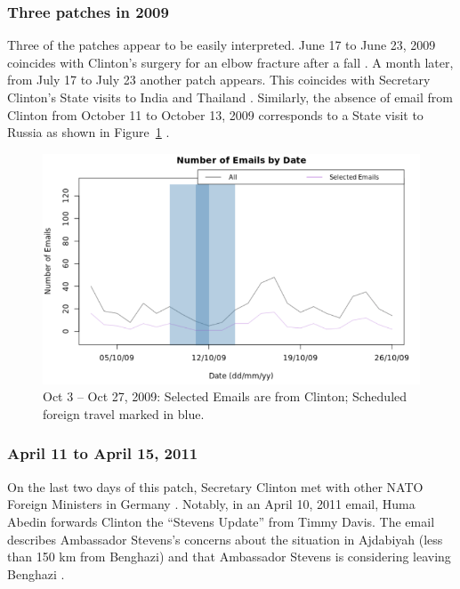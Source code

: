 \documentclass[journal]{vgtc}                %
\begin{document}
\subsubsection{Three patches in 2009}
Three of the patches appear to be easily interpreted.   June 17 to June 23, 2009 coincides with Clinton's surgery for an elbow fracture after a fall \cite{ClintonFracture2009}.  A month later, from July 17 to July 23 another patch appears.  This coincides with Secretary Clinton's State visits to India and Thailand \cite{ForeignSched}.  Similarly, the absence of email from Clinton from October 11 to  October 13, 2009 corresponds to a State visit to Russia as shown in  Figure~\ref{fig:ClintonZerosOctober2009AndForeignSchedule} \cite{ForeignSched, visitRussia}.
\begin{figure}[h]
\begin{center}
\includegraphics[width=0.95\linewidth]{ClintonZerosOctober2009AndForeignSchedule}
\caption{Oct 3 -- Oct 27, 2009:  Selected Emails are from Clinton; Scheduled foreign travel marked in blue.}
\label{fig:ClintonZerosOctober2009AndForeignSchedule}
\end{center}
\end{figure}

\subsubsection{April 11 to April 15, 2011}
On the last two days of %
this patch, Secretary Clinton met with other NATO Foreign Ministers in Germany \cite{ForeignSched}.   Notably, in an April 10, 2011 email, Huma Abedin forwards Clinton the ``Stevens Update'' from Timmy Davis.  The email describes Ambassador Stevens's concerns about the situation in Ajdabiyah (less than 150 km from Benghazi) and that Ambassador Stevens is considering leaving Benghazi \cite{StevensUpdate}.
\end{document}
